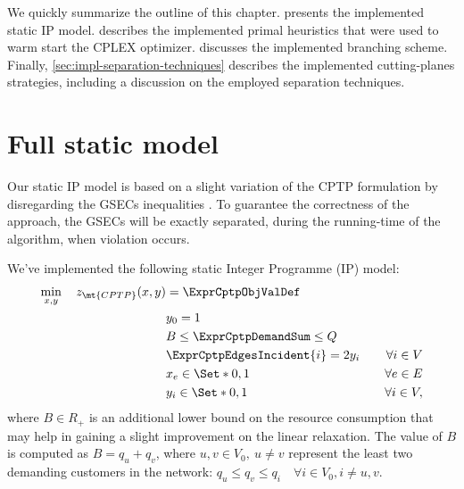 \medskip

We quickly summarize the outline of this chapter.
 presents the implemented static IP model.
 describes the implemented primal heuristics
that were used to warm start the CPLEX optimizer.
 discusses the implemented branching scheme.
Finally, \cref{sec:impl-separation-techniques} describes the implemented cutting-planes strategies,
including a discussion on the employed separation techniques.

\section{Full static model}
\label{sec:impl-full-static-model}

Our static IP model is based on a slight variation of the CPTP formulation
by disregarding the GSECs inequalities .
To guarantee the correctness of the approach,
the GSECs will be exactly separated, during the running-time of the algorithm,
when violation occurs.

We've implemented the following static Integer Programme (IP) model:
\begin{align}
	\min_{x,y} \quad z_\mt{CPTP}(x, y) & = \ExprCptpObjValDef                     & \label{eq:cptp-static-model-0}                         \\
	                                   & y_0 = 1                                  & \label{eq:cptp-static-model-1}                         \\
	                                   & B \le   \ExprCptpDemandSum   \le Q       & \label{eq:cptp-static-model-2}                         \\
	                                   & \ExprCptpEdgesIncident{i}    = 2 y_i     & \quad \forall i \in V  \label{eq:cptp-static-model-3}  \\
	                                   & x_{e}                   \in \Set*{0, 1}  & \quad \forall e \in E  \label{eq:cptp-static-model-4}  \\
	                                   & y_{i}                    \in \Set*{0, 1} & \quad \forall i \in V  \label{eq:cptp-static-model-5},
\end{align}
where
$B \in R_+$ is an additional lower bound on the resource consumption
that may help in gaining a slight improvement on the linear relaxation.
The value of $B$ is computed as $B = q_u + q_v$, where $u, v \in V_0,\ u \ne v$
represent the least two demanding customers in the network:
$q_u \le q_v \le q_i \quad \forall i \in V_0, i \ne u, v$.

